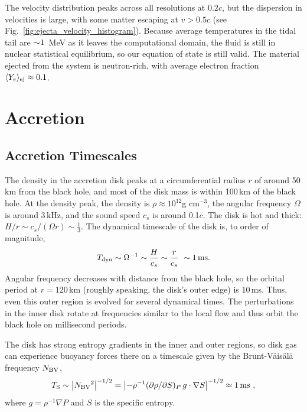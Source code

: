 The velocity distribution peaks across all resolutions at $0.2c$, but the dispersion in
velocities is large, with some matter escaping at $v>0.5c$
(see Fig.~\ref{fig:ejecta_velocity_histogram}).
Because average temperatures in the tidal tail are $\mathord{\sim} 1$~MeV as it leaves
the computational domain, the fluid is still in nuclear statistical equilibrium,
so our equation of state is still valid.
The material ejected from the
system is neutron-rich, with average electron fraction
$\langle Y_e \rangle_{\rm ej} \approx 0.1$.

\section{Accretion}
\label{sec:accretion}

\subsection{Accretion Timescales}
\label{sec:scales}

The density in the accretion disk peaks at a circumferential
radius $r$ of around 50\,km from the black hole, and most of the
disk mass is within 100\,km of the black hole.  At the density
peak, the density is $\rho\approx 10^{12}$g cm${}^{-3}$, the
angular frequency $\Omega$ is around 3\,kHz, and the sound speed $c_s$
is around 0.1$c$.  The disk is hot and
thick:  $H/r\sim c_s/(\Omega r)\sim\frac{1}{3}$. 
The dynamical timescale of the disk is, to order of magnitude,
\begin{equation}
T_{\rm dyn} \sim \Omega^{-1} \sim \frac{H}{c_s} \sim \frac{r}{c_s}\
\sim 1\,\mathrm{ms}.
\end{equation}
Angular frequency decreases with distance from the black hole, so the
orbital period at $r=$120\,km (roughly speaking, the disk's outer edge)
is 10\,ms.  Thus, even this outer region is evolved for several
dynamical times. 
The perturbations in the inner disk rotate at frequencies similar to
the local flow and thus orbit the black hole on millisecond periods. 

The disk has strong entropy gradients in the inner and outer regions,
so disk gas can experience buoyancy forces there on a timescale given by the
Brunt-V\"ais\"al\"a frequency $N_{\rm BV}$,
\begin{equation}
T_{\rm S} \sim \left|N_{\rm BV}{}^2\right|^{-1/2}
=  \left|-\rho^{-1}(\partial\rho/\partial S)_P\,g\cdot\nabla S\right|^{-1/2} \approx 1{\rm\,ms}\ ,
\end{equation}
where $g=\rho^{-1}\nabla P$ and $S$ is the specific entropy. 

